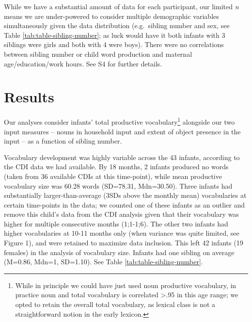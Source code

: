 \documentclass[
  man,floatsintext]{apa6}
\begin{document}
While we have a substantial amount of data for each participant, our limited \emph{n} means we are under-powered to consider multiple demographic variables simultaneously given the data distribution (e.g.~sibling number and sex, see Table \ref{tab:table-sibling-number}; as luck would have it both infants with 3 siblings were girls and both with 4 were boys). There were no correlations between sibling number or child word production and maternal age/education/work hours. See S4 for further details.

\hypertarget{results}{%
\section{Results}\label{results}}

Our analyses consider infants' total productive vocabulary\footnote{While in principle we could have just used noun productive vocabulary, in practice noun and total vocabulary is correlated \textgreater.95 in this age range; we opted to retain the overall total vocabulary, as lexical class is not a straightforward notion in the early lexicon.} alongside our two input measures -- nouns in household input and extent of object presence in the input -- as a function of sibling number.

Vocabulary development was highly variable across the 43 infants, according to the CDI data we had available. By 18 months, 2 infants produced no words (taken from 36 available CDIs at this time-point), while mean productive vocabulary size was 60.28 words (SD=78.31, Mdn=30.50). Three infants had substantially larger-than-average (3SDs above the monthly mean) vocabularies at certain time-points in the data; we counted one of these infants as an outlier and remove this child's data from the CDI analysis given that their vocabulary was higher for multiple consecutive months (1;1-1;6). The other two infants had higher vocabularies at 10-11 months only (when variance was quite limited, see Figure 1), and were retained to maximize data inclusion. This left 42 infants (19 females) in the analysis of vocabulary size. Infants had one sibling on average (M=0.86, Mdn=1, SD=1.10). See Table \ref{tab:table-sibling-number}.
\end{document}
